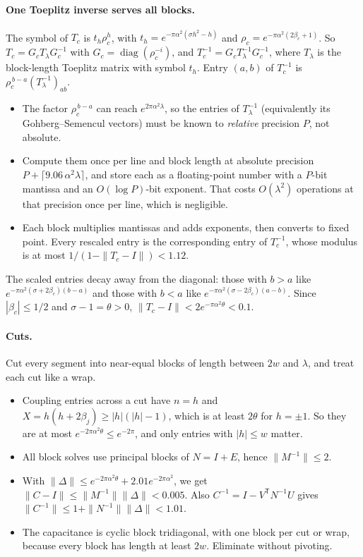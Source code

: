 \documentclass[11pt]{article}
\theoremstyle{remark}\newtheorem*{remark}{Remark}
\begin{document}
\paragraph{One Toeplitz inverse serves all blocks.} The symbol of $T_c$ is
$t_h\rho_c^{h}$, with $t_h=e^{-\pi\alpha^2(\sigma h^2-h)}$ and $\rho_c=e^{-\pi\alpha^2(2\beta_c+1)}$.
So $T_c=G_cT_\lambda G_c^{-1}$ with $G_c=\operatorname{diag}(\rho_c^{-i})$, and
$T_c^{-1}=G_cT_\lambda^{-1}G_c^{-1}$, where $T_\lambda$ is the block-length Toeplitz matrix with
symbol $t_h$. Entry $(a,b)$ of $T_c^{-1}$ is $\rho_c^{\,b-a}(T_\lambda^{-1})_{ab}$.
\begin{itemize}
\item The factor $\rho_c^{\,b-a}$ can reach $e^{2\pi\alpha^2\lambda}$, so the entries of
$T_\lambda^{-1}$ (equivalently its Gohberg--Semencul vectors) must be known to \emph{relative}
precision $P$, not absolute.
\item Compute them once per line and block length at absolute precision
$P+\lceil9.06\,\alpha^2\lambda\rceil$, and store each as a floating-point number with a $P$-bit
mantissa and an $O(\log P)$-bit exponent. That costs $O(\lambda^2)$ operations at that
precision once per line, which is negligible.
\item Each block multiplies mantissas and adds exponents, then converts to fixed point. Every
rescaled entry is the corresponding entry of $T_c^{-1}$, whose modulus is at most
$1/(1-\|T_c-I\|)<1.12$.
\end{itemize}
The scaled entries decay away from the diagonal: those with $b>a$ like
$e^{-\pi\alpha^2(\sigma+2\beta_c)(b-a)}$ and those with $b<a$ like
$e^{-\pi\alpha^2(\sigma-2\beta_c)(a-b)}$. Since $|\beta_c|\le1/2$ and $\sigma-1=\theta>0$,
$\|T_c-I\|<2e^{-\pi\alpha^2\theta}<0.1$.

\paragraph{Cuts.} Cut every segment into near-equal blocks of length between $2w$ and
$\lambda$, and treat each cut like a wrap.
\begin{itemize}
\item Coupling entries across a cut have $n=h$ and $X=h(h+2\beta_j)\ge|h|(|h|-1)$, which is
at least $2\theta$ for $h=\pm1$. So they are at most $e^{-2\pi\alpha^2\theta}\le e^{-2\pi}$, and
only entries with $|h|\le w$ matter.
\item All block solves use principal blocks of $N=I+E$, hence $\|M^{-1}\|\le2$.
\item With $\|\Delta\|\le e^{-2\pi\alpha^2\theta}+2.01e^{-2\pi\alpha^2}$, we get
$\|C-I\|\le\|M^{-1}\|\|\Delta\|<0.005$. Also $C^{-1}=I-V^{\mathsf T}N^{-1}U$ gives
$\|C^{-1}\|\le1+\|N^{-1}\|\|\Delta\|<1.01$.
\item The capacitance is cyclic block tridiagonal, with one block per cut or wrap, because
every block has length at least $2w$. Eliminate without pivoting.
\end{itemize}
\end{document}
